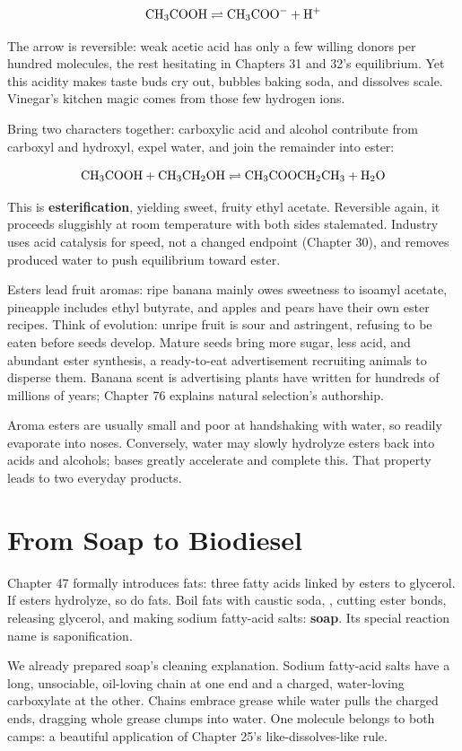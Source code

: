 \[\mathrm{CH_3COOH} \rightleftharpoons \mathrm{CH_3COO^-} + \mathrm{H^+}\]

The arrow is reversible: weak acetic acid has only a few willing donors per hundred molecules, the rest hesitating in Chapters 31 and 32's equilibrium. Yet this acidity makes taste buds cry out, bubbles baking soda, and dissolves scale. Vinegar's kitchen magic comes from those few hydrogen ions.

Bring two characters together: carboxylic acid and alcohol contribute from carboxyl and hydroxyl, expel water, and join the remainder into ester:

\[\mathrm{CH_3COOH} + \mathrm{CH_3CH_2OH} \rightleftharpoons \mathrm{CH_3COOCH_2CH_3} + \mathrm{H_2O}\]

This is \textbf{esterification}, yielding sweet, fruity ethyl acetate. Reversible again, it proceeds sluggishly at room temperature with both sides stalemated. Industry uses acid catalysis for speed, not a changed endpoint (Chapter 30), and removes produced water to push equilibrium toward ester.

Esters lead fruit aromas: ripe banana mainly owes sweetness to isoamyl acetate, pineapple includes ethyl butyrate, and apples and pears have their own ester recipes. Think of evolution: unripe fruit is sour and astringent, refusing to be eaten before seeds develop. Mature seeds bring more sugar, less acid, and abundant ester synthesis, a ready-to-eat advertisement recruiting animals to disperse them. Banana scent is advertising plants have written for hundreds of millions of years; Chapter 76 explains natural selection's authorship.

Aroma esters are usually small and poor at handshaking with water, so readily evaporate into noses. Conversely, water may slowly hydrolyze esters back into acids and alcohols; bases greatly accelerate and complete this. That property leads to two everyday products.

\section{From Soap to Biodiesel}

Chapter 47 formally introduces fats: three fatty acids linked by esters to glycerol. If esters hydrolyze, so do fats. Boil fats with caustic soda, , cutting ester bonds, releasing glycerol, and making sodium fatty-acid salts: \textbf{soap}. Its special reaction name is saponification.

We already prepared soap's cleaning explanation. Sodium fatty-acid salts have a long, unsociable, oil-loving chain at one end and a charged, water-loving carboxylate at the other. Chains embrace grease while water pulls the charged ends, dragging whole grease clumps into water. One molecule belongs to both camps: a beautiful application of Chapter 25's like-dissolves-like rule.

